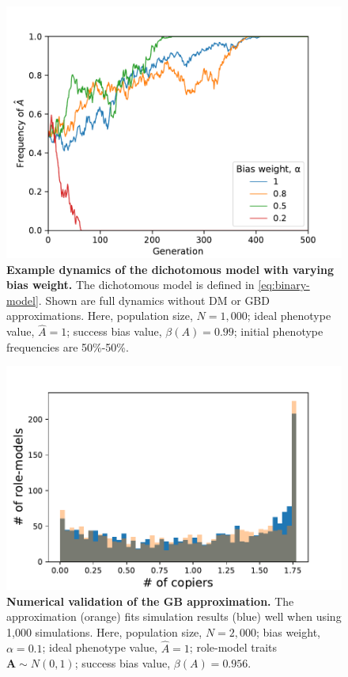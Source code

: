 \documentclass[12pt]{extarticle}
\let\vec\mathbf
\begin{document}
\begin{figure}[h]
    \includegraphics[width=1\linewidth]{timeseries.pdf}
  \caption{
  \textbf{Example dynamics of the dichotomous model with varying bias weight.}
  The dichotomous model is defined in \cref{eq:binary-model}. Shown are full dynamics without DM or GBD approximations.
  Here, population size, $N=1,000$; ideal phenotype value, $\hat{A}=1$; success bias value, $\beta(A)=0.99$; initial phenotype frequencies are 50\%-50\%.
  }	
  \label{fig:timeseries}
\end{figure}


\begin{figure}[h]
    \includegraphics[width=0.7\linewidth]{GBD_validation.pdf}
  \caption{
  \textbf{Numerical validation of the GB approximation.}
  The approximation (orange) fits simulation results (blue) well when using 1,000 simulations. 
  Here, population size, $N=2,000$; bias weight, $\alpha=0.1$; {ideal} phenotype value, $\hat{A}=1$; role-model traits $\vec{A} \sim N(0,1)$; success bias value, $\beta(A)=0.956$.}	
  \label{fig:GBD}
\end{figure}
\end{document}
